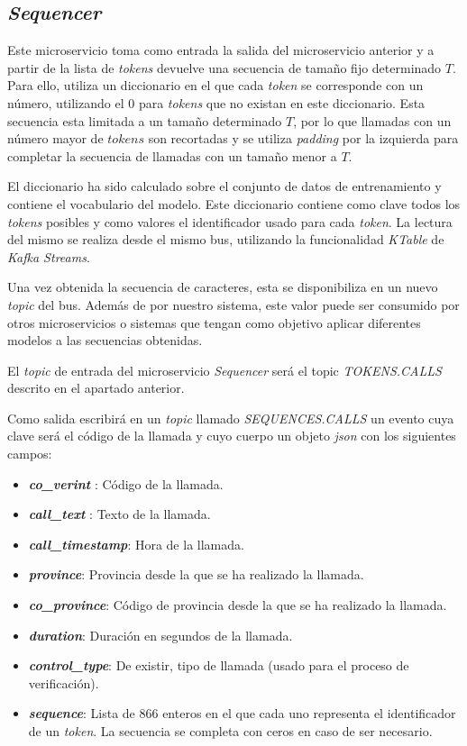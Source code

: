 \subsection{\textit{Sequencer}}
Este microservicio toma como entrada la salida del microservicio anterior y a partir de la lista de \textit{tokens} devuelve una secuencia de tamaño fijo determinado $T$. Para ello, utiliza un diccionario en el que cada \textit{token} se corresponde con un número, utilizando el $0$ para \textit{tokens} que no existan en este diccionario. Esta secuencia esta limitada a un tamaño determinado $T$, por lo que llamadas con un número mayor de $tokens$ son recortadas y se utiliza \textit{padding} por la izquierda para completar la secuencia de llamadas con un tamaño menor a $T$.

El diccionario ha sido calculado sobre el conjunto de datos de  entrenamiento y contiene el vocabulario del modelo. Este diccionario contiene como clave todos los \textit{tokens} posibles y como valores el identificador usado para cada \textit{token}. La lectura del mismo se realiza desde el mismo bus, utilizando la funcionalidad \textit{KTable} de \textit{Kafka Streams}.


Una vez obtenida la secuencia de caracteres, esta se disponibiliza en un nuevo \textit{topic} del bus. Además de por nuestro sistema, este valor puede ser consumido por otros microservicios o sistemas que tengan como objetivo aplicar diferentes modelos a las secuencias obtenidas.

El \textit{topic} de entrada del microservicio \textit{Sequencer} será el topic  \textit{TOKENS.CALLS} descrito en el apartado anterior. 

Como salida escribirá en un \textit{topic}  llamado \textit{SEQUENCES.CALLS} un evento cuya clave será el código de la llamada y cuyo cuerpo un objeto \textit{json} con los siguientes campos:

\begin{itemize}
		\item \textbf{\textit{co\_verint}} : Código de la llamada. 
		\item  \textbf{\textit{call\_text}} : Texto de la llamada. 
		\item  \textbf{\textit{call\_timestamp}}: Hora de la llamada.
        \item \textbf{\textit{province}}: Provincia desde la que se ha realizado la llamada. 
        \item \textbf{\textit{co\_province}}: Código de provincia desde la que se ha realizado la llamada. 
        \item \textbf{\textit{duration}}: Duración en segundos de la llamada. 
        \item \textbf{\textit{control\_type}}: De existir, tipo de llamada (usado para el proceso de verificación).  
        \item \textbf{\textit{sequence}}: Lista de 866 enteros en el que cada uno representa el identificador de un \textit{token}. La secuencia se completa con ceros en caso de ser necesario.
\end{itemize} 


